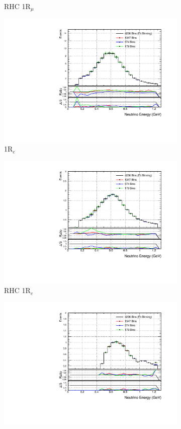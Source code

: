 \begin{figure}[!htbp]
\begin{subfigure}{.49\textwidth}
  \caption{RHC 1R$_{\mu}$}
\end{subfigure}
\begin{subfigure}{.49\textwidth}
  \centering
  \includegraphics[width=0.95\linewidth]{figs/detbin_nue}
  \caption{1R$_{e}$}
\end{subfigure}
\begin{subfigure}{.49\textwidth}
  \centering
  \includegraphics[width=0.95\linewidth]{figs/detbin_nuebar}
  \caption{RHC 1R$_{e}$}
\end{subfigure}
\begin{subfigure}{.49\textwidth}
  \centering
  \includegraphics[width=0.95\linewidth]{figs/detbin_nue1pi}

\end{subfigure}
\end{figure}
